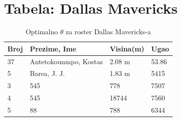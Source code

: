 \documentclass[a4paper, 12pt]{article}
\begin{document}



\section{Tabela: Dallas Mavericks}

\begin{table}[h]
\begin{center}
 \begin{tabular}{|p{0.7cm}|p{5cm}|p{2cm}|p{2cm}||} 
 \hline
 Broj & Prezime, Ime & Visina(m) & Ugao\\ %
 \hline
 37 & Antetokounmpo, Kostas & 2.08 m & 53.86 \\  %
 \hline
 5 & Barea, J. J. & 1.83 m & 5415 \\
 \hline
 3 & 545 & 778 & 7507 \\
 \hline
 4 & 545 & 18744 & 7560 \\
 \hline
 5 & 88 & 788 & 6344 \\ [1ex] 
 \hline
\end{tabular}
\label{tabela 1}
\caption{Optimalno $\theta$ za roster Dallas Mavericks-a}
\end{center}
\end{table}
\end{document}
